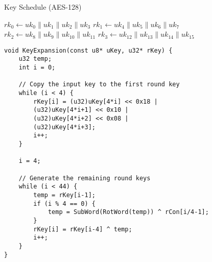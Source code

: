 \begin{algorithm}[H]
	\caption{Key Schedule (AES-128)}
	
	\BlankLine
	\( rk_0 \leftarrow uk_0\parallel uk_1\parallel uk_2 \parallel uk_3 \)\;
	\( rk_1 \leftarrow uk_4\parallel uk_5\parallel uk_6 \parallel uk_7 \)\;
	\( rk_2 \leftarrow uk_8\parallel uk_9\parallel uk_{10} \parallel uk_{11} \)\;
	\( rk_3 \leftarrow uk_{12}\parallel uk_{13}\parallel uk_{14} \parallel uk_{15} \)\;
\end{algorithm}
\vspace{24pt}
\begin{lstlisting}[style=C, caption={AES-128 Key Expansion},captionpos=t]
void KeyExpansion(const u8* uKey, u32* rKey) {
	u32 temp;
	int i = 0;
	
	// Copy the input key to the first round key
	while (i < 4) {
		rKey[i] = (u32)uKey[4*i] << 0x18 | 
		(u32)uKey[4*i+1] << 0x10 | 
		(u32)uKey[4*i+2] << 0x08 | 
		(u32)uKey[4*i+3];
		i++;
	}
	
	i = 4;
	
	// Generate the remaining round keys
	while (i < 44) {
		temp = rKey[i-1];
		if (i % 4 == 0) {
			temp = SubWord(RotWord(temp)) ^ rCon[i/4-1];
		}
		rKey[i] = rKey[i-4] ^ temp;
		i++;
	}
}
\end{lstlisting}

\newpage
